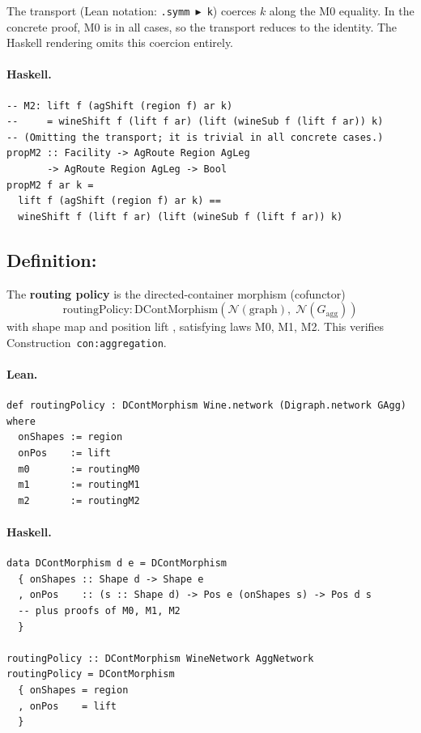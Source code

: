 \documentclass[11pt,a4paper]{article}
\begin{document}
\begin{fidelitynote}
The transport  (Lean notation: \texttt{.symm \(\blacktriangleright\) k}) coerces $k$ along the M0
equality.  In the concrete proof, M0 is  in all cases, so the
transport reduces to the identity.  The Haskell rendering omits this coercion
entirely.
\end{fidelitynote}

\paragraph{Haskell.}
\begin{lstlisting}[style=haskell]
-- M2: lift f (agShift (region f) ar k)
--     = wineShift f (lift f ar) (lift (wineSub f (lift f ar)) k)
-- (Omitting the transport; it is trivial in all concrete cases.)
propM2 :: Facility -> AgRoute Region AgLeg
       -> AgRoute Region AgLeg -> Bool
propM2 f ar k =
  lift f (agShift (region f) ar k) ==
  wineShift f (lift f ar) (lift (wineSub f (lift f ar)) k)
\end{lstlisting}


\subsection{Definition: }

\begin{defn}
The \textbf{routing policy} is the directed-container morphism (cofunctor)
\[
  \mathrm{routingPolicy} : \mathrm{DContMorphism}(\mathcal{N}(\mathrm{graph}),\;
  \mathcal{N}(G_{\mathrm{agg}}))
\]
with shape map  and position lift , satisfying laws M0,
M1, M2.  This verifies Construction~\texttt{con:aggregation}.
\end{defn}

\paragraph{Lean.}
\begin{lstlisting}[style=lean]
def routingPolicy : DContMorphism Wine.network (Digraph.network GAgg) where
  onShapes := region
  onPos    := lift
  m0       := routingM0
  m1       := routingM1
  m2       := routingM2
\end{lstlisting}

\paragraph{Haskell.}
\begin{lstlisting}[style=haskell]
data DContMorphism d e = DContMorphism
  { onShapes :: Shape d -> Shape e
  , onPos    :: (s :: Shape d) -> Pos e (onShapes s) -> Pos d s
  -- plus proofs of M0, M1, M2
  }

routingPolicy :: DContMorphism WineNetwork AggNetwork
routingPolicy = DContMorphism
  { onShapes = region
  , onPos    = lift
  }
\end{lstlisting}
\end{document}
